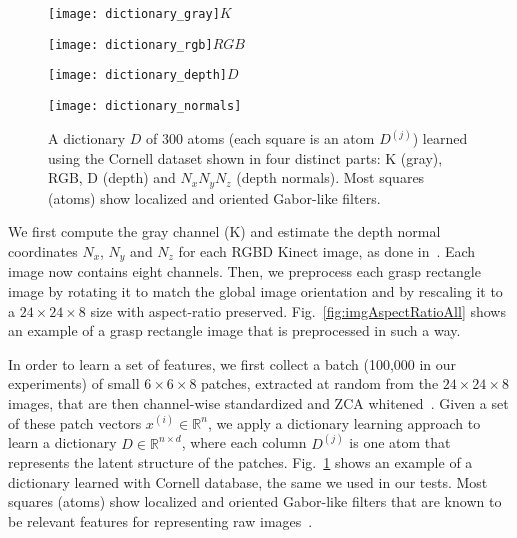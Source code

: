 \documentclass[svgnames]{scrartcl}
\begin{document}
\begin{figure}[t]
    \centering
    \begin{minipage}{.3\linewidth}
        \centering
        \texttt{[image: dictionary\_gray]}{\scriptsize $K$}
    \end{minipage}%
    \begin{minipage}{0.3\linewidth}
        \centering
        \texttt{[image: dictionary\_rgb]}{\scriptsize $RGB$}
    \end{minipage}%
    
    \begin{minipage}{0.3\linewidth}
        \centering
        \texttt{[image: dictionary\_depth]}{\scriptsize $D$}
    \end{minipage}%
    \begin{minipage}{0.3\linewidth}
        \centering
        \texttt{[image: dictionary\_normals]}
        \vspace{-3pt}{\scriptsize  $N_x N_y N_z$}
    \end{minipage}%
    \caption{A dictionary $D$ of 300 atoms (each square is an atom $D^{(j)}$) learned using the Cornell dataset shown in four distinct parts: K (gray), RGB, D (depth) and $N_x N_y N_z$ (depth normals). Most squares (atoms) show localized and oriented Gabor-like filters.}
    \label{fig:dictionary}
\end{figure}

We first compute the gray channel (K) and estimate the depth normal coordinates $N_x$, $N_y$ and $N_z$ for each RGBD Kinect image, as done in~\citet{bo2013unsupervised}. Each image now contains eight channels. Then, we preprocess each grasp rectangle image by rotating it to match the global image orientation and by rescaling it to a $24 \times 24 \times 8$ size with aspect-ratio preserved.  Fig.~\ref{fig:imgAspectRatioAll} shows an example of a grasp rectangle image that is preprocessed in such a way.

In order to learn a set of features, we first collect a batch (100,000 in our experiments) of small $6 \times 6 \times 8$ patches, extracted at random from the $24 \times 24 \times 8$ images, that are then channel-wise standardized and ZCA whitened~\citep{hyvarinen2004independent}. Given a set of these patch vectors $x^{(i)} \in \mathbb{R}^n$, we apply a dictionary learning approach to learn a dictionary $D \in \mathbb{R}^{n \times d}$, where each column $D^{(j)}$ is one atom that represents the latent structure of the patches. Fig.~\ref{fig:dictionary} shows an example of a dictionary learned with Cornell database, the same we used in our tests. Most squares (atoms) show localized and oriented Gabor-like filters that are known to be relevant features for representing raw images~\citep{marvcelja1980mathematical}.
\end{document}
